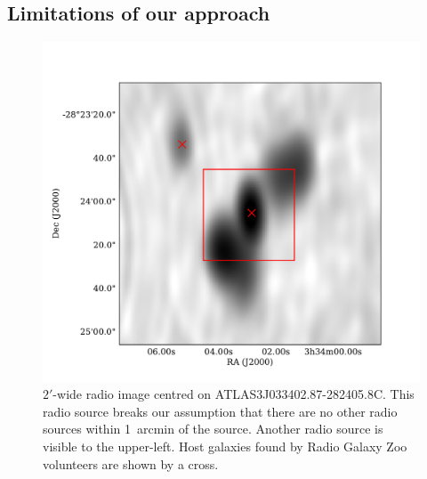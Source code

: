 \documentclass[fleqn,usenatbib,usedcolumn]{mnras}
\begin{document}
  \subsection{Limitations of our approach}
     \begin{figure}
      \centering
      \includegraphics[width=\linewidth]{images/CI0077C1_fig.pdf}
      \caption{$2'$-wide radio image centred on ATLAS3\textunderscore{}J033402.87-282405.8C.
        This radio source breaks our assumption that there are no other radio
        sources within 1~arcmin of the source. Another radio source is visible
        to the upper-left. Host galaxies found by Radio Galaxy Zoo volunteers
        are shown by a cross.}
      \label{fig:broken-isolation}
    \end{figure}
\end{document}

